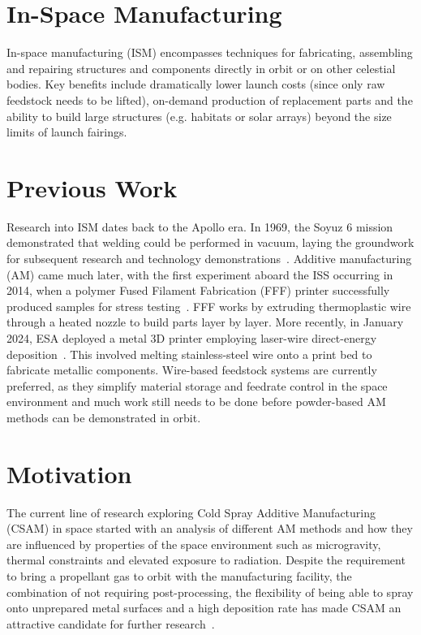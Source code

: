 \section{In-Space Manufacturing}
In-space manufacturing (ISM) encompasses techniques for fabricating, assembling and repairing structures and components directly in orbit or on other celestial bodies. Key benefits include dramatically lower launch costs (since only raw feedstock needs to be lifted), on-demand production of replacement parts and the ability to build large structures (e.g. habitats or solar arrays) beyond the size limits of launch fairings.

\section{Previous Work}
Research into ISM dates back to the Apollo era. In 1969, the Soyuz 6 mission demonstrated that welding could be performed in vacuum, laying the groundwork for subsequent research and technology demonstrations~\cite{nasa1984welding}. Additive manufacturing (AM) came much later, with the first experiment aboard the ISS occurring in 2014, when a polymer Fused Filament Fabrication (FFF) printer successfully produced samples for stress testing~\cite{Prater2019}. FFF works by extruding thermoplastic wire through a heated nozzle to build parts layer by layer. More recently, in January 2024, ESA deployed a metal 3D printer employing laser-wire direct-energy deposition~\cite{ESA2024Metal3DPrinter}. This involved melting stainless-steel wire onto a print bed to fabricate metallic components. Wire-based feedstock systems are currently preferred, as they simplify material storage and feedrate control in the space environment and much work still needs to be done before powder-based AM methods can be demonstrated in orbit.

\section{Motivation}
The current line of research exploring Cold Spray Additive Manufacturing (CSAM) in space started with an analysis of different AM methods and how they are influenced by properties of the space environment such as microgravity, thermal constraints and elevated exposure to radiation. Despite the requirement to bring a propellant gas to orbit with the manufacturing facility, the combination of not requiring post-processing, the flexibility of being able to spray onto unprepared metal surfaces and a high deposition rate has made CSAM an attractive candidate for further research~\cite{malagowski2019amspace}.

